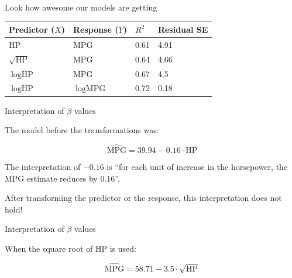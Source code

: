 \documentclass{beamer}\usepackage[]{graphicx}\usepackage[]{color}
\newenvironment{knitrout}{}{} %
\begin{document}
\begin{darkframes}
\begin{frame}[fragile]
\begin{knitrout}
\end{knitrout}
    \end{frame}
  
    \begin{frame}{Look how awesome our models are getting}

      \begin{center}
        \begin{tabular}{llll}
          Predictor ($X$) & Response ($Y$) & $R^2$ & Residual SE \\
          \hline
          $\text{HP}$ & $\text{MPG}$ & 0.61 & 4.91 \\
          $\sqrt{\text{HP}}$ & $\text{MPG}$ & 0.64  & 4.66 \\
          $\log\text{HP}$ & $\text{MPG}$ & 0.67 & 4.5 \\
          $\log\text{HP}$ & $\log\text{MPG}$ & 0.72 & 0.18 \\
        \end{tabular}
      \end{center}
    \end{frame}
  
  
  
  
    \begin{frame}[fragile]{Interpretation of $\beta$ values}

      \begin{center} 
        The model before the transformations was:
        
        \[
          \widehat{\text{MPG}} = 39.94 - 0.16 \cdot\text{HP}
        \] 

        \bigskip \pause
        
        The interpretation of $- 0.16$ is ``for each unit of increase in the horsepower, the MPG estimate reduces by $ 0.16$''.
        \bigskip \pause
        
        \alert{After transforming the predictor or the response, this interpretation does not hold!}
      
      \end{center}
    \end{frame}
  
  
  
  \begin{frame}[fragile]{Interpretation of $\beta$ values}

      \begin{center} 
        When the square root of HP is used: \bigskip
        
        \[
        \widehat{\text{MPG}} = 58.71 
        - 3.5 \cdot\sqrt{\text{HP}}        
        \] \bigskip \pause
        

\end{center}
\end{frame}
\end{darkframes}
\end{document}
